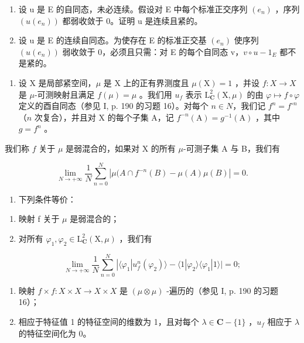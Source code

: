 \begin{enumerate}
\def\labelenumi{\alph{enumi})}
\setcounter{enumi}{1}
\item
  设 u 是 E 的自同态，未必连续。假设对 E 中每个标准正交序列 \((e_{n})\) ，序列 \((u(e_{n}))\) 都弱收敛于 0。证明 u 是连续且紧的。
\item
  设 u 是 E 的连续自同态。为使存在 E 的标准正交基 \((e_{n})\) 使序列 \((u(e_{n}))\) 弱收敛于 0，必须且只需：对 E 的每个自同态 v，\(v \circ u - 1_{E}\) 都不是紧的。
\end{enumerate}

\begin{enumerate}
\def\labelenumi{\arabic{enumi})}
\setcounter{enumi}{13}
\tightlist
\item
  设 X 是局部紧空间，\(\mu\) 是 X 上的正有界测度且 \(\mu(\mathrm{X}) = 1\) ，并设 \(f: X \to X\) 是 \(\mu\)-可测映射且满足 \(f(\mu) = \mu\) 。我们用 \(u_{f}\) 表示 \(\mathrm{L}_{\mathbf{C}}^{2}(\mathrm{X}, \mu)\) 的由 \(\varphi \mapsto f \circ \varphi\) 定义的酉自同态（参见 I, p. 190 的习题 16）。对每个 \(n \in N\)，我们记 \(f^{n} = f^{\circ n}\) （\(n\) 次复合），并且对 X 的每个子集 A，记 \(f^{-n}(\mathrm{A}) = g^{-1}(\mathrm{A})\) ，其中 \(g = f^{n}\) 。
\end{enumerate}

我们称 \(f\) 关于 \(\mu\) 是弱混合的，如果对 X 的所有 \(\mu\)-可测子集 A 与 B，我们有

\[
\lim _ {N \rightarrow + \infty} \frac {1}{N} \sum_ {n = 0} ^ {N} | \mu (A \cap f ^ {- n} (B) - \mu (A) \mu (B) | = 0.
\]

\begin{enumerate}
\def\labelenumi{\alph{enumi})}
\tightlist
\item
  下列条件等价：
\end{enumerate}

\begin{enumerate}
\def\labelenumi{(\roman{enumi})}
\item
  映射 f 关于 \(\mu\) 是弱混合的；
\item
  对所有 \(\varphi_{1},\varphi_{2} \in \mathrm{L}_{\mathbf{C}}^{2}(\mathrm{X}, \mu)\) ，我们有
\end{enumerate}

\[
\lim _ {N \to + \infty} \frac {1}{N} \sum_ {n = 0} ^ {N} | \langle \varphi_ {1} | u _ {f} ^ {n} (\varphi_ {2}) \rangle - \langle 1 | \varphi_ {2} \rangle \langle \varphi_ {1} | 1 \rangle | = 0;
\]

\begin{enumerate}
\def\labelenumi{(\roman{enumi})}
\setcounter{enumi}{2}
\item
  映射 \(f \times f: X \times X \to X \times X\) 是 \((\mu \otimes \mu)\) -遍历的（参见 I, p. 190 的习题 16）；
\item
  相应于特征值 1 的特征空间的维数为 1，且对每个 \(\lambda \in \mathbf{C} - \{1\}\) ，\(u_{f}\) 相应于 \(\lambda\) 的特征空间化为 0。
\end{enumerate}


